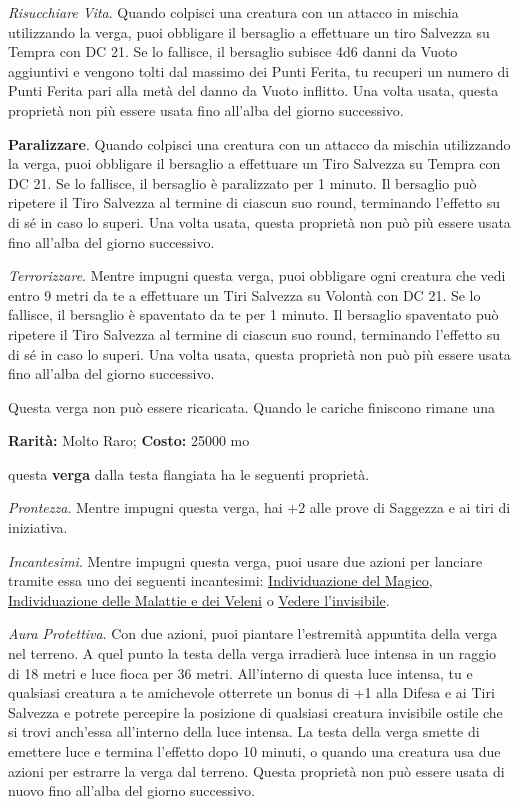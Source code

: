\begin{multicols}{2}
\emph{Risucchiare Vita}. Quando colpisci una creatura con un attacco in mischia utilizzando la verga, puoi obbligare il bersaglio a effettuare un tiro Salvezza su Tempra con DC 21. Se lo fallisce, il bersaglio subisce 4d6 danni da Vuoto aggiuntivi e vengono tolti dal massimo dei Punti Ferita, tu recuperi un numero di Punti Ferita pari alla metà del danno da Vuoto inflitto. Una volta usata, questa proprietà non più essere usata fino all'alba del giorno successivo.

\textbf{Paralizzare}. Quando colpisci una creatura con un attacco da mischia utilizzando la verga, puoi obbligare il bersaglio a effettuare un Tiro Salvezza su Tempra con DC 21. Se lo fallisce, il bersaglio è paralizzato per 1 minuto. Il bersaglio può ripetere il Tiro Salvezza al termine di ciascun suo round, terminando l'effetto su di sé in caso lo superi. Una volta usata, questa proprietà non può più essere usata fino all'alba del giorno successivo.

\emph{Terrorizzare}. Mentre impugni questa verga, puoi obbligare ogni creatura che vedi entro 9 metri da te a effettuare un Tiri Salvezza su Volontà con DC 21. Se lo fallisce, il bersaglio è spaventato da te per 1 minuto. Il bersaglio spaventato può ripetere il Tiro Salvezza al termine di ciascun suo round, terminando l'effetto su di sé in caso lo superi. Una volta usata, questa proprietà non può più essere usata fino all'alba del giorno successivo.

Questa verga non può essere ricaricata. Quando le cariche finiscono rimane una


\textbf{Rarità:} Molto Raro; \textbf{Costo:} 25000 mo

questa \textbf{verga} dalla testa flangiata ha le seguenti proprietà.

\emph{Prontezza}. Mentre impugni questa verga, hai +2 alle prove di Saggezza e ai tiri di iniziativa.

\emph{Incantesimi}. Mentre impugni questa verga, puoi usare due azioni per lanciare tramite essa uno dei seguenti incantesimi: \hyperlink{Bacchettadell'IndividuazionedelMagico}{Individuazione del Magico}, \hyperlink{Individuazione delle Malattie e dei Veleni}{Individuazione delle Malattie e dei Veleni} o \hyperlink{Vedere l'invisibile}{Vedere l'invisibile}.

\emph{Aura Protettiva}. Con due azioni, puoi piantare l'estremità appuntita della verga nel terreno. A quel punto la testa della verga irradierà luce intensa in un raggio di 18 metri e luce fioca per 36 metri. All'interno di questa luce intensa, tu e qualsiasi creatura a te amichevole otterrete un bonus di +1 alla Difesa e ai Tiri Salvezza e potrete percepire la posizione di qualsiasi creatura invisibile ostile che si trovi anch'essa all'interno della luce intensa. La testa della verga smette di emettere luce e termina l'effetto dopo 10 minuti, o quando una creatura usa due azioni per estrarre la verga dal terreno. Questa proprietà non può essere usata di nuovo fino all'alba del giorno successivo.


\end{multicols}
